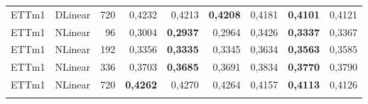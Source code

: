 \begin{longtable}{@{}llr rrr rrr@{}}
ETTm1 & DLinear & 720 & 0{,}4232 & 0{,}4213 & \textbf{0{,}4208} & 0{,}4181 & \textbf{0{,}4101} & 0{,}4121 \\
\addlinespace[2pt]
ETTm1 & NLinear & 96 & 0{,}3004 & \textbf{0{,}2937} & 0{,}2964 & 0{,}3426 & \textbf{0{,}3337} & 0{,}3367 \\
ETTm1 & NLinear & 192 & 0{,}3356 & \textbf{0{,}3335} & 0{,}3345 & 0{,}3634 & \textbf{0{,}3563} & 0{,}3585 \\
ETTm1 & NLinear & 336 & 0{,}3703 & \textbf{0{,}3685} & 0{,}3691 & 0{,}3834 & \textbf{0{,}3770} & 0{,}3790 \\
ETTm1 & NLinear & 720 & \textbf{0{,}4262} & 0{,}4270 & 0{,}4264 & 0{,}4157 & \textbf{0{,}4113} & 0{,}4126 \\
\addlinespace[2pt]
\bottomrule
\end{longtable}
